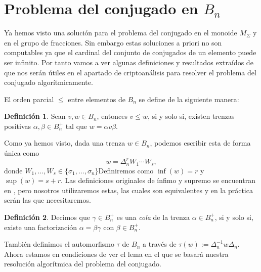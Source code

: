 \documentclass[12pt]{book}
\theoremstyle{definition}
\newtheorem{defi}{Definición}[section]
\begin{document}
\section{Problema del conjugado en $B_n$}

Ya hemos visto una solución para el problema del conjugado en el monoide $M_\Sigma$ y en el grupo de fracciones. Sin embargo estas soluciones a priori no son computables ya que el cardinal del conjunto de conjugados de un elemento puede ser infinito. Por tanto vamos a ver algunas definiciones y resultados extraídos de \cite{Att} que nos serán útiles en el apartado de criptoanálisis para resolver el problema del conjugado algorítmicamente.

El orden parcial $\leq$ entre elementos de $B_n$ se define de la siguiente manera:

\begin{defi}
Sean $v,w\in B_n$, entonces $v\leq w$, si y solo si, existen trenzas positivas $\alpha,\beta\in B_n^{+}$ tal que $w = \alpha v\beta$.
\end{defi}

Como ya hemos visto, dada una trenza $w\in B_n$, podemos escribir esta de forma única como
$$w = \Delta_n^r W_1\cdots W_s,$$
donde $W_1,\ldots,W_s\in\{\sigma_1,\ldots,\sigma_n\}$Definiremos como $\inf(w) = r$ y $\sup(w)=s+r$. Las definiciones originales de ínfimo y supremo se encuentran en \cite{Alg}, pero nosotros utilizaremos estas, las cuales son equivalentes y en la práctica serán las que necesitaremos.

\begin{defi}
Decimos que $\gamma\in B_n^+$ es una \textit{cola} de la trenza $\alpha\in B_n^+$, si y solo si, existe una factorización $\alpha = \beta\gamma$ con $\beta\in B_n^+$.
\end{defi}

También definimos el automorfismo $\tau$ de $B_n$ a través de $\tau(w):=\Delta_n^{-1}w\Delta_n$. Ahora estamos en condiciones de ver el lema en el que se basará nuestra resolución algorítmica del problema del conjugado.
\end{document}

